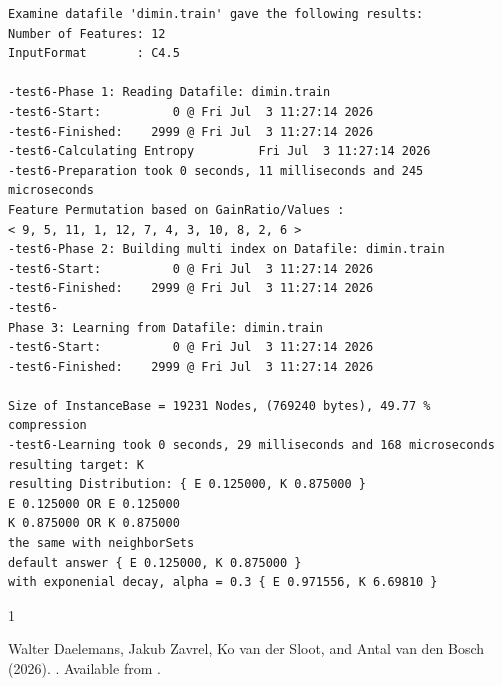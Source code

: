 \documentclass{report}
\begin{document}
\begin{footnotesize}
\begin{verbatim}
Examine datafile 'dimin.train' gave the following results:
Number of Features: 12
InputFormat       : C4.5

-test6-Phase 1: Reading Datafile: dimin.train
-test6-Start:          0 @ Fri Jul  3 11:27:14 2026
-test6-Finished:    2999 @ Fri Jul  3 11:27:14 2026
-test6-Calculating Entropy         Fri Jul  3 11:27:14 2026
-test6-Preparation took 0 seconds, 11 milliseconds and 245 microseconds
Feature Permutation based on GainRatio/Values :
< 9, 5, 11, 1, 12, 7, 4, 3, 10, 8, 2, 6 >
-test6-Phase 2: Building multi index on Datafile: dimin.train
-test6-Start:          0 @ Fri Jul  3 11:27:14 2026
-test6-Finished:    2999 @ Fri Jul  3 11:27:14 2026
-test6-
Phase 3: Learning from Datafile: dimin.train
-test6-Start:          0 @ Fri Jul  3 11:27:14 2026
-test6-Finished:    2999 @ Fri Jul  3 11:27:14 2026

Size of InstanceBase = 19231 Nodes, (769240 bytes), 49.77 % compression
-test6-Learning took 0 seconds, 29 milliseconds and 168 microseconds
resulting target: K
resulting Distribution: { E 0.125000, K 0.875000 }
E 0.125000 OR E 0.125000
K 0.875000 OR K 0.875000
the same with neighborSets
default answer { E 0.125000, K 0.875000 }
with exponenial decay, alpha = 0.3 { E 0.971556, K 6.69810 }
\end{verbatim}
\end{footnotesize}

\clearpage

\begin{thebibliography}{1}

Walter Daelemans, Jakub Zavrel, Ko van der Sloot, and Antal van den
  Bosch (2026).
.
\newblock Available from \timblmanualurl.

\end{thebibliography}
\end{document}
